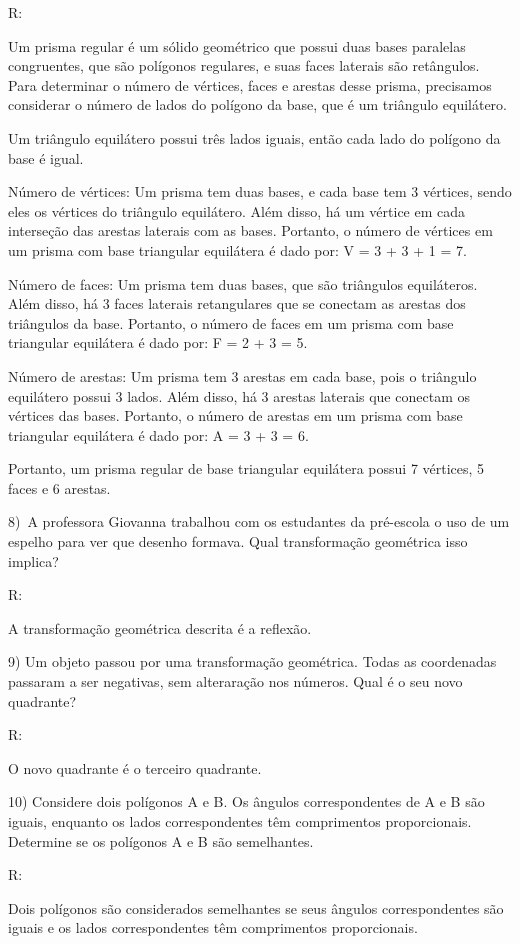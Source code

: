 R:

Um prisma regular é um sólido geométrico que possui duas bases paralelas
congruentes, que são polígonos regulares, e suas faces laterais são
retângulos. Para determinar o número de vértices, faces e arestas desse
prisma, precisamos considerar o número de lados do polígono da base, que
é um triângulo equilátero.

Um triângulo equilátero possui três lados iguais, então cada lado do
polígono da base é igual.

Número de vértices: Um prisma tem duas bases, e cada base tem 3
vértices, sendo eles os vértices do triângulo equilátero. Além disso, há
um vértice em cada interseção das arestas laterais com as bases.
Portanto, o número de vértices em um prisma com base triangular
equilátera é dado por: V = 3 + 3 + 1 = 7.

Número de faces: Um prisma tem duas bases, que são triângulos
equiláteros. Além disso, há 3 faces laterais retangulares que se
conectam as arestas dos triângulos da base. Portanto, o número de faces
em um prisma com base triangular equilátera é dado por: F = 2 + 3 = 5.

Número de arestas: Um prisma tem 3 arestas em cada base, pois o
triângulo equilátero possui 3 lados. Além disso, há 3 arestas laterais
que conectam os vértices das bases. Portanto, o número de arestas em um
prisma com base triangular equilátera é dado por: A = 3 + 3 = 6.

Portanto, um prisma regular de base triangular equilátera possui 7
vértices, 5 faces e 6 arestas.

8)~A professora Giovanna trabalhou com os estudantes da pré-escola o uso
de um espelho para ver que desenho formava. Qual transformação
geométrica isso implica?

R:

A transformação geométrica descrita é a reflexão.

9) Um objeto passou por uma transformação geométrica. Todas as
coordenadas passaram a ser negativas, sem alteraração nos números. Qual
é o seu novo quadrante?~

R:

O novo quadrante é o terceiro quadrante.

10) Considere dois polígonos A e B. Os ângulos correspondentes de A e B
são iguais, enquanto os lados correspondentes têm comprimentos
proporcionais. Determine se os polígonos A e B são semelhantes.

R:

Dois polígonos são considerados semelhantes se seus ângulos
correspondentes são iguais e os lados correspondentes têm comprimentos
proporcionais.

